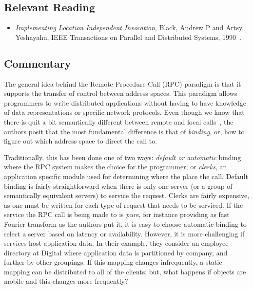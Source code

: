 \subsection{Relevant Reading}

\begin{itemize}
	\item \textit{Implementing Location Independent Invocation}, Black, Andrew P and Artsy, Yeshayahu, IEEE Transactions on Parallel and Distributed Systems, 1990~\cite{black1990implementing}.
\end{itemize}

\subsection{Commentary}

The general idea behind the Remote Procedure Call (RPC) paradigm is that it supports the transfer of control between address spaces.  This paradigm allows programmers to write distributed applications without having to have knowledge of data representations or specific network protocols.  Even though we know that there is quit a bit semantically different between remote and local calls~\cite{kendall1994note, black1990implementing}, the authors posit that the most fundamental difference is that of \textit{binding}, or, how to figure out which address space to direct the call to.

Traditionally, this has been done one of two ways: \textit{default or automatic} binding where the RPC system makes the choice for the programmer; or \textit{clerks}, an application specific module used for determining where the place the call.  Default binding is fairly straightforward when there is only one server (or a group of semantically equivalent servers) to service the request.  Clerks are fairly expensive, as one must be written for each type of request that needs to be serviced.  If the service the RPC call is being made to is \textit{pure}, for instance providing as fast Fourier transform as the authors put it, it is easy to choose automatic binding to select a server based on latency or availability.  However, it is more challenging if services host application data.  In their example, they consider an employee directory at Digital where application data is partitioned by company, and further by other groupings.  If this mapping changes infrequently, a static mapping can be distributed to all of the clients; but, what happens if objects are mobile and this changes more frequently?

